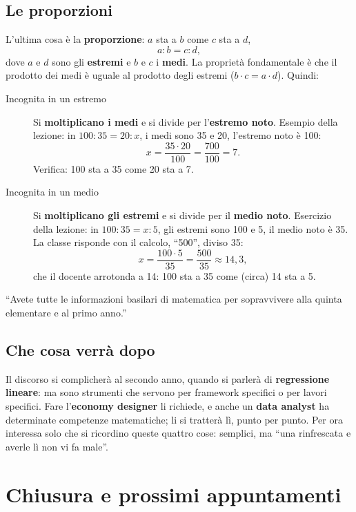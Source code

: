 \subsection{Le proporzioni}

L'ultima cosa è la \textbf{proporzione}: $a$ sta a $b$ come $c$ sta a $d$,
\[
  a : b = c : d ,
\]
dove $a$ e $d$ sono gli \textbf{estremi} e $b$ e $c$ i \textbf{medi}. La
proprietà fondamentale è che il prodotto dei medi è uguale al prodotto degli
estremi ($b \cdot c = a \cdot d$). Quindi:
\begin{description}
  \item[Incognita in un estremo] Si \textbf{moltiplicano i medi} e si divide
        per l'\textbf{estremo noto}. Esempio della lezione: in
        $100 : 35 = 20 : x$, i medi sono 35 e 20, l'estremo noto è 100:
        \[ x = \frac{35 \cdot 20}{100} = \frac{700}{100} = 7 . \]
        Verifica: 100 sta a 35 come 20 sta a 7.
  \item[Incognita in un medio] Si \textbf{moltiplicano gli estremi} e si
        divide per il \textbf{medio noto}. Esercizio della lezione: in
        $100 : 35 = x : 5$, gli estremi sono 100 e 5, il medio noto è 35. La
        classe risponde con il calcolo, ``500'', diviso 35:
        \[ x = \frac{100 \cdot 5}{35} = \frac{500}{35} \approx 14{,}3 , \]
        che il docente arrotonda a 14: 100 sta a 35 come (circa) 14 sta
        a 5.
\end{description}

``Avete tutte le informazioni basilari di matematica per sopravvivere alla
quinta elementare e al primo anno.''

\subsection{Che cosa verrà dopo}

Il discorso si complicherà al secondo anno, quando si parlerà di
\textbf{regressione lineare}: ma sono strumenti che servono per framework
specifici o per lavori specifici. Fare l'\textbf{economy designer} li
richiede, e anche un \textbf{data analyst} ha determinate competenze
matematiche; li si tratterà lì, punto per punto. Per ora interessa solo che
si ricordino queste quattro cose: semplici, ma ``una rinfrescata e averle lì
non vi fa male''.

\section{Chiusura e prossimi appuntamenti}
\label{sec:chiusura-gd6}


